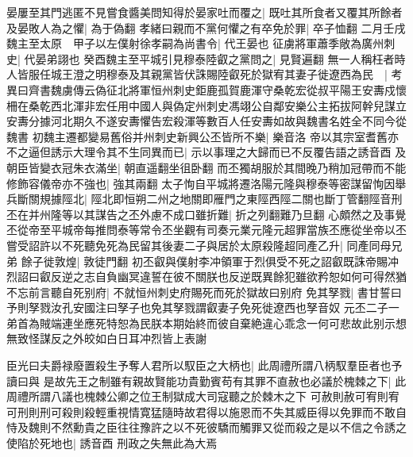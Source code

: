 晏屢至其門逃匿不見嘗食醬美問知得於晏家吐而覆之|{
	既吐其所食者又覆其所餘者}
及晏敗人為之懼|{
	為于偽翻}
孝緒曰親而不黨何懼之有卒免於罪|{
	卒子恤翻}
二月壬戌魏主至太原　甲子以左僕射徐孝嗣為尚書令|{
	代王晏也}
征虜將軍蕭季敞為廣州刺史|{
	代晏弟詡也}
癸酉魏主至平城引見穆泰陸叡之黨問之|{
	見賢遍翻}
無一人稱枉者時人皆服任城王澄之明穆泰及其親黨皆伏誅賜陸叡死於獄宥其妻子徙遼西為民　|{
	考異曰齊書魏虜傳云偽征北將軍恒州刺史鉅鹿孤賀鹿渾守桑乾宏從叔平陽王安夀戍懷柵在桑乾西北渾非宏任用中國人與偽定州刺史馮翊公自鄰安樂公主拓拔阿幹兒謀立安夀分據河北期久不遂安夀懼告宏殺渾等數百人任安夀如故與魏書名姓全不同今從魏書}
初魏主遷都變易舊俗并州刺史新興公丕皆所不樂|{
	樂音洛}
帝以其宗室耆舊亦不之逼但誘示大理令其不生同異而已|{
	示以事理之大歸而已不反覆告語之誘音酉}
及朝臣皆變衣冠朱衣滿坐|{
	朝直遥翻坐徂卧翻}
而丕獨胡服於其間晚乃稍加冠帶而不能修飾容儀帝亦不強也|{
	強其兩翻}
太子恂自平城將遷洛陽元隆與穆泰等密謀留恂因舉兵斷關規據陘北|{
	陘北即恒朔二州之地關即雁門之東陘西陘二關也斷丁管翻陘音刑}
丕在并州隆等以其謀告之丕外慮不成口雖折難|{
	折之列翻難乃旦翻}
心頗然之及事覺丕從帝至平城帝每推問泰等常令丕坐觀有司奏元業元隆元超罪當族丕應從坐帝以丕嘗受詔許以不死聽免死為民留其後妻二子與居於太原殺隆超同產乙升|{
	同產同母兄弟}
餘子徙敦煌|{
	敦徒門翻}
初丕叡與僕射李冲領軍于烈俱受不死之詔叡既誅帝賜冲烈詔曰叡反逆之志自負幽冥違誓在彼不關朕也反逆既異餘犯雖欲矜恕如何可得然猶不忘前言聽自死别府|{
	不就恒州刺史府賜死而死於獄故曰别府}
免其孥戮|{
	書甘誓曰予則孥戮汝孔安國注曰孥子也免其孥戮謂叡妻子免死徙遼西也孥音奴}
元丕二子一弟首為賊端連坐應死特恕為民朕本期始終而彼自棄絶違心乖念一何可悲故此别示想無致怪謀反之外皎如白日耳冲烈皆上表謝

臣光曰夫爵禄廢置殺生予奪人君所以馭臣之大柄也|{
	此周禮所謂八柄馭羣臣者也予讀曰與}
是故先王之制雖有親故賢能功貴勤賓苟有其罪不直赦也必議於槐棘之下|{
	此周禮所謂八議也槐棘公卿之位王制獄成大司寇聽之於棘木之下}
可赦則赦可宥則宥可刑則刑可殺則殺輕重視情寛猛隨時故君得以施恩而不失其威臣得以免罪而不敢自恃及魏則不然勳貴之臣往往豫許之以不死彼驕而觸罪又從而殺之是以不信之令誘之使陷於死地也|{
	誘音酉}
刑政之失無此為大焉

